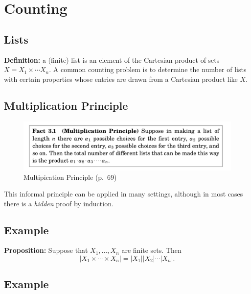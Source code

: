 \documentclass[
]{article}
\author{}
\date{}
\begin{document}
\hypertarget{counting}{%
\section{Counting}\label{counting}}

\hypertarget{lists}{%
\subsection{Lists}\label{lists}}

\textbf{Definition:} a (finite) list is an element of the Cartesian
product of sets \(X=X_1\times\cdots X_n\). A common counting problem is
to determine the number of lists with certain properties whose entries
are drawn from a Cartesian product like \(X\).

\hypertarget{multiplication-principle}{%
\subsection{Multiplication Principle}\label{multiplication-principle}}

\begin{figure}
\centering
\includegraphics{../../png/MultiplicationPrinciple.png}
\caption{Multipication Principle (p.~69)}
\end{figure}

This informal principle can be applied in many settings, although in
most cases there is a \emph{hidden} proof by induction.

\hypertarget{example}{%
\subsection{Example}\label{example}}

\textbf{Proposition:} Suppose that \(X_1,\ldots,X_n\) are finite sets.
Then \[
|X_{1}\times\cdots\times X_{n}|=|X_{1}||X_{2}|\cdots |X_{n}|.
\] \vfill\eject

\hypertarget{example-1}{%
\subsection{Example}\label{example-1}}
\end{document}
